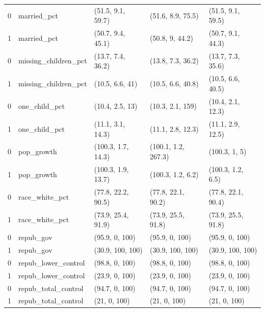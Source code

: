 \begin{table}[ht]
\begin{tabular}{rllll}
  0 & married\_pct & (51.5, 9.1, 59.7) & (51.6, 8.9, 75.5) & (51.5, 9.1, 59.5) \\ 
  1 & married\_pct & (50.7, 9.4, 45.1) & (50.8, 9, 44.2) & (50.7, 9.1, 44.3) \\ 
  0 & missing\_children\_pct & (13.7, 7.4, 36.2) & (13.8, 7.3, 36.2) & (13.7, 7.3, 35.6) \\ 
  1 & missing\_children\_pct & (10.5, 6.6, 41) & (10.5, 6.6, 40.8) & (10.5, 6.6, 40.5) \\ 
  0 & one\_child\_pct & (10.4, 2.5, 13) & (10.3, 2.1, 159) & (10.4, 2.1, 12.3) \\ 
  1 & one\_child\_pct & (11.1, 3.1, 14.3) & (11.1, 2.8, 12.3) & (11.1, 2.9, 12.5) \\ 
  0 & pop\_growth & (100.3, 1.7, 14.3) & (100.1, 1.2, 267.3) & (100.3, 1, 5) \\ 
  1 & pop\_growth & (100.3, 1.9, 13.7) & (100.3, 1.2, 6.2) & (100.3, 1.2, 6.5) \\ 
  0 & race\_white\_pct & (77.8, 22.2, 90.5) & (77.8, 22.1, 90.2) & (77.8, 22.1, 90.4) \\ 
  1 & race\_white\_pct & (73.9, 25.4, 91.9) & (73.9, 25.5, 91.8) & (73.9, 25.5, 91.8) \\ 
  0 & repub\_gov & (95.9, 0, 100) & (95.9, 0, 100) & (95.9, 0, 100) \\ 
  1 & repub\_gov & (30.9, 100, 100) & (30.9, 100, 100) & (30.9, 100, 100) \\
  0 & repub\_lower\_control & (98.8, 0, 100) & (98.8, 0, 100) & (98.8, 0, 100) \\ 
  1 & repub\_lower\_control & (23.9, 0, 100) & (23.9, 0, 100) & (23.9, 0, 100) \\ 
  0 & repub\_total\_control & (94.7, 0, 100) & (94.7, 0, 100) & (94.7, 0, 100) \\ 
  1 & repub\_total\_control & (21, 0, 100) & (21, 0, 100) & (21, 0, 100) \\ 
   \bottomrule
\end{tabular}
\end{table}

